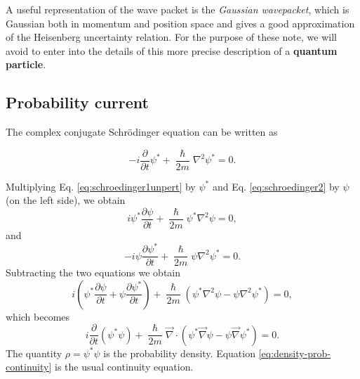 A useful representation of the wave packet is the \emph{Gaussian wavepacket}, which is Gaussian both in momentum and position space and gives a good approximation of the Heisenberg uncertainty relation. For the purpose of these note, we will avoid to enter into the details of this more precise description of a \textbf{quantum particle}.

\subsection{Probability current}

The complex conjugate Schr\"odinger equation can be written as

    \begin{equation}
        -i\frac{\partial}{\partial t}\psi^* + \frac{\hslash}{2m}\nabla^2\psi^* = 0.
        \label{eq:schroedinger2}
    \end{equation}
    
    Multiplying Eq. \eqref{eq:schroedinger1unpert} by $\psi^*$ and Eq. \eqref{eq:schroedinger2} by $\psi$ (on the left side), we obtain
    \begin{equation*}
        i\psi^*\frac{\partial\psi}{\partial t} + \frac{\hslash}{2m}\psi^*\nabla^2\psi = 0, 
    \end{equation*}
    and
    \begin{equation*}
        -i\psi\frac{\partial\psi^*}{\partial t} + \frac{\hslash}{2m}\psi\nabla^2\psi^* = 0.
    \end{equation*}
    Subtracting the two equations we obtain
    \begin{equation*}
        i\left(\psi^*\frac{\partial\psi}{\partial t}+\psi\frac{\partial\psi^*}{\partial t}\right) + \frac{\hslash}{2m}\left(\psi^*\nabla^2\psi - \psi\nabla^2\psi^*\right) = 0,
    \end{equation*}
    which becomes
    \begin{equation}
        i\frac{\partial}{\partial t}(\psi^*\psi) + \frac{\hslash}{2m}\Vec{\nabla}\cdot(\psi^*\Vec{\nabla}\psi - \psi\Vec{\nabla}\psi^*) = 0.
        \label{eq:density-prob-continuity}
    \end{equation}
    The quantity $\rho = \psi^*\psi$ is the probability density. Equation \ref{eq:density-prob-continuity} is the usual continuity equation.
    
